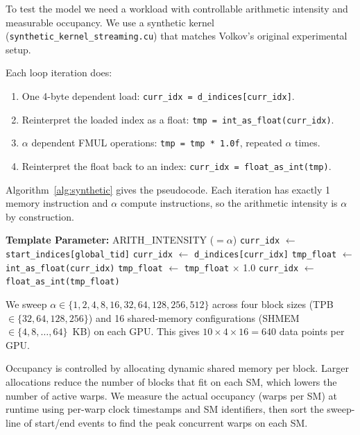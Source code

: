 To test the model we need a workload with controllable arithmetic intensity
and measurable occupancy.
We use a synthetic kernel (\texttt{synthetic\_kernel\_streaming.cu}) that
matches Volkov's original experimental setup.

Each loop iteration does:
\begin{enumerate}
  \item One 4-byte dependent load: \texttt{curr\_idx = d\_indices[curr\_idx]}.
  \item Reinterpret the loaded index as a float: \texttt{tmp = int\_as\_float(curr\_idx)}.
  \item $\alpha$ dependent FMUL operations: \texttt{tmp = tmp * 1.0f}, repeated
        $\alpha$ times.
  \item Reinterpret the float back to an index: \texttt{curr\_idx = float\_as\_int(tmp)}.
\end{enumerate}

Algorithm~\ref{alg:synthetic} gives the pseudocode.
Each iteration has exactly 1 memory instruction and $\alpha$ compute instructions,
so the arithmetic intensity is $\alpha$ by construction.

\begin{algorithm}[t]
\caption{Synthetic Kernel Pseudocode}
\label{alg:synthetic}
\begin{algorithmic}[1]
\STATE \textbf{Template Parameter:} ARITH\_INTENSITY ($= \alpha$)
\STATE \texttt{curr\_idx} $\leftarrow$ \texttt{start\_indices[global\_tid]}
    \STATE \texttt{curr\_idx} $\leftarrow$ \texttt{d\_indices[curr\_idx]} 
    \STATE \texttt{tmp\_float} $\leftarrow$ \texttt{int\_as\_float(curr\_idx)}
        \STATE \texttt{tmp\_float} $\leftarrow$ \texttt{tmp\_float} $\times$ 1.0 
    \ENDFOR
    \STATE \texttt{curr\_idx} $\leftarrow$ \texttt{float\_as\_int(tmp\_float)}
\ENDFOR
\end{algorithmic}
\end{algorithm}

We sweep $\alpha \in \{1, 2, 4, 8, 16, 32, 64, 128, 256, 512\}$ across
four block sizes (TPB $\in \{32, 64, 128, 256\}$) and 16 shared-memory
configurations (SHMEM $\in \{4, 8, \ldots, 64\}$~KB) on each GPU.
This gives $10 \times 4 \times 16 = 640$ data points per GPU.

Occupancy is controlled by allocating dynamic shared memory per block.
Larger allocations reduce the number of blocks that fit on each SM, which
lowers the number of active warps.
We measure the actual occupancy (warps per SM) at runtime using
per-warp clock timestamps and SM identifiers,
then sort the sweep-line of start/end events to find the peak concurrent
warps on each SM.


